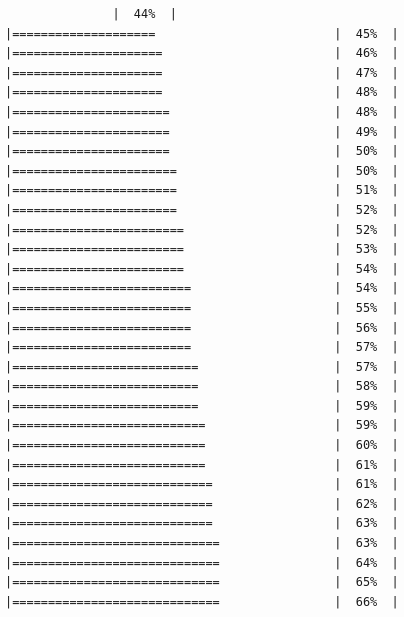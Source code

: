 \documentclass[
  krantz2]{krantz}
\begin{document}
\begin{verbatim}
               |  44%  |                                                     |====================                         |  45%  |                                                     |=====================                        |  46%  |                                                     |=====================                        |  47%  |                                                     |=====================                        |  48%  |                                                     |======================                       |  48%  |                                                     |======================                       |  49%  |                                                     |======================                       |  50%  |                                                     |=======================                      |  50%  |                                                     |=======================                      |  51%  |                                                     |=======================                      |  52%  |                                                     |========================                     |  52%  |                                                     |========================                     |  53%  |                                                     |========================                     |  54%  |                                                     |=========================                    |  54%  |                                                     |=========================                    |  55%  |                                                     |=========================                    |  56%  |                                                     |=========================                    |  57%  |                                                     |==========================                   |  57%  |                                                     |==========================                   |  58%  |                                                     |==========================                   |  59%  |                                                     |===========================                  |  59%  |                                                     |===========================                  |  60%  |                                                     |===========================                  |  61%  |                                                     |============================                 |  61%  |                                                     |============================                 |  62%  |                                                     |============================                 |  63%  |                                                     |=============================                |  63%  |                                                     |=============================                |  64%  |                                                     |=============================                |  65%  |                                                     |=============================                |  66%  |                                                     
\end{verbatim}
\end{document}
